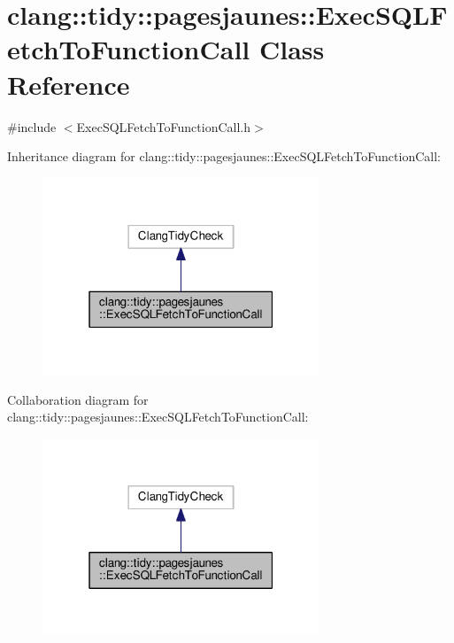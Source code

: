 \hypertarget{classclang_1_1tidy_1_1pagesjaunes_1_1_exec_s_q_l_fetch_to_function_call}{}\section{clang\+:\+:tidy\+:\+:pagesjaunes\+:\+:Exec\+S\+Q\+L\+Fetch\+To\+Function\+Call Class Reference}
\label{classclang_1_1tidy_1_1pagesjaunes_1_1_exec_s_q_l_fetch_to_function_call}


{\ttfamily \#include $<$Exec\+S\+Q\+L\+Fetch\+To\+Function\+Call.\+h$>$}



Inheritance diagram for clang\+:\+:tidy\+:\+:pagesjaunes\+:\+:Exec\+S\+Q\+L\+Fetch\+To\+Function\+Call\+:
\nopagebreak
\begin{figure}[H]
\begin{center}
\leavevmode
\includegraphics[width=235pt]{classclang_1_1tidy_1_1pagesjaunes_1_1_exec_s_q_l_fetch_to_function_call__inherit__graph}
\end{center}
\end{figure}


Collaboration diagram for clang\+:\+:tidy\+:\+:pagesjaunes\+:\+:Exec\+S\+Q\+L\+Fetch\+To\+Function\+Call\+:
\nopagebreak
\begin{figure}[H]
\begin{center}
\leavevmode
\includegraphics[width=235pt]{classclang_1_1tidy_1_1pagesjaunes_1_1_exec_s_q_l_fetch_to_function_call__coll__graph}
\end{center}
\end{figure}
